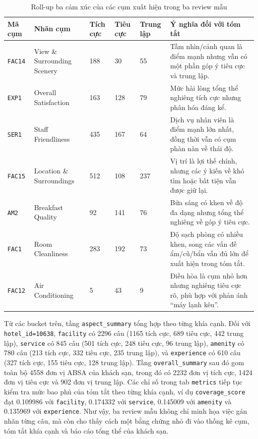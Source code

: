 \begin{table}[tbp]
\centering
\caption{Roll-up ba cảm xúc của các cụm xuất hiện trong ba review mẫu}
\label{tab:method1-three-review-cluster-rollup}
\small
\setlength{\tabcolsep}{4pt}
\renewcommand{\arraystretch}{1.08}
\begin{tabularx}{\textwidth}{L{0.12\textwidth} L{0.24\textwidth} R{0.10\textwidth} R{0.10\textwidth} R{0.10\textwidth} Y}
\toprule
\textbf{Mã cụm} & \textbf{Nhãn cụm} & \textbf{Tích cực} & \textbf{Tiêu cực} & \textbf{Trung lập} & \textbf{Ý nghĩa đối với tóm tắt} \\
\midrule
\texttt{FAC14} & View \& Surrounding Scenery & \num{188} & \num{30} & \num{55} & Tầm nhìn/cảnh quan là điểm mạnh nhưng vẫn có một phần góp ý tiêu cực và trung lập. \\
\texttt{EXP1} & Overall Satisfaction & \num{163} & \num{128} & \num{79} & Mức hài lòng tổng thể nghiêng tích cực nhưng phân hóa đáng kể. \\
\texttt{SER1} & Staff Friendliness & \num{435} & \num{167} & \num{64} & Dịch vụ nhân viên là điểm mạnh lớn nhất, đồng thời vẫn có cụm phàn nàn về thái độ. \\
\texttt{FAC15} & Location \& Surroundings & \num{512} & \num{108} & \num{237} & Vị trí là lợi thế chính, nhưng các ý kiến về khó tìm hoặc bất tiện vẫn được giữ lại. \\
\texttt{AM2} & Breakfast Quality & \num{92} & \num{141} & \num{76} & Bữa sáng có khen về độ đa dạng nhưng tổng thể nghiêng về góp ý tiêu cực. \\
\texttt{FAC1} & Room Cleanliness & \num{283} & \num{192} & \num{73} & Độ sạch phòng có nhiều khen, song các vấn đề ẩm/cũ/bẩn vẫn đủ lớn để xuất hiện trong tóm tắt. \\
\texttt{FAC12} & Air Conditioning & \num{5} & \num{43} & \num{9} & Điều hòa là cụm nhỏ hơn nhưng nghiêng tiêu cực rõ, phù hợp với phản ánh ``máy lạnh kêu''. \\
\bottomrule
\end{tabularx}
\end{table}

Từ các bucket trên, tầng \texttt{aspect\_summary} tổng hợp theo từng khía cạnh.
Đối với \texttt{hotel\_id=10638}, \texttt{facility} có \num{2296} câu
(\num{1165} tích cực, \num{689} tiêu cực, \num{442} trung lập), \texttt{service}
có \num{845} câu (\num{501} tích cực, \num{248} tiêu cực, \num{96} trung lập),
\texttt{amenity} có \num{780} câu (\num{213} tích cực, \num{332} tiêu cực,
\num{235} trung lập), và \texttt{experience} có \num{610} câu (\num{327} tích cực,
\num{155} tiêu cực, \num{128} trung lập). Tầng \texttt{overall\_summary} sau đó
gom toàn bộ \num{4558} đơn vị ABSA của khách sạn, trong đó có \num{2232} đơn vị
tích cực, \num{1424} đơn vị tiêu cực và \num{902} đơn vị trung lập. Các chỉ số
trong tab \texttt{metrics} tiếp tục kiểm tra mức bao phủ của tóm tắt theo từng
khía cạnh, ví dụ \texttt{coverage\_score} đạt \num{0.109986} với
\texttt{facility}, \num{0.174332} với \texttt{service}, \num{0.145009} với
\texttt{amenity} và \num{0.135969} với \texttt{experience}. Như vậy, ba review
mẫu không chỉ minh họa việc gán nhãn từng câu, mà còn cho thấy cách một bằng
chứng nhỏ đi vào thống kê cụm, tóm tắt khía cạnh và báo cáo tổng thể của khách
sạn.
